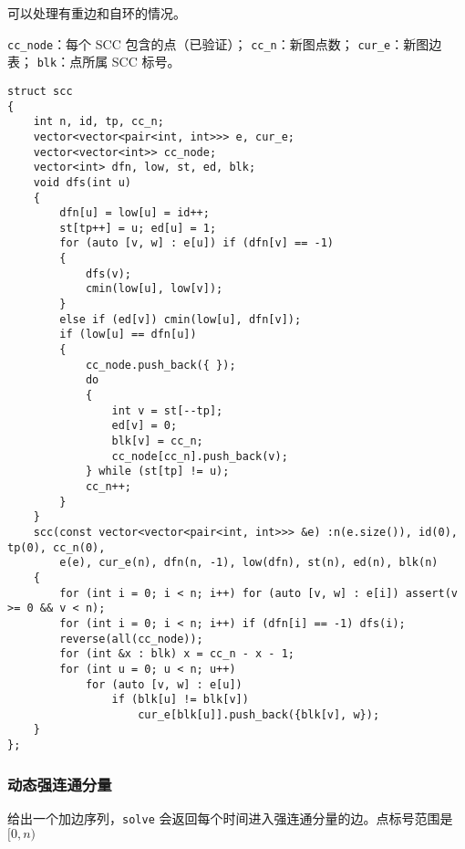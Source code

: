 \documentclass[12pt]{ctexart}
\begin{document}
可以处理有重边和自环的情况。

\verb|cc_node|：每个 SCC 包含的点（已验证）；
\verb|cc_n|：新图点数；
\verb|cur_e|：新图边表；
\verb|blk|：点所属 SCC 标号。

\begin{lstlisting}
struct scc
{
	int n, id, tp, cc_n;
	vector<vector<pair<int, int>>> e, cur_e;
	vector<vector<int>> cc_node;
	vector<int> dfn, low, st, ed, blk;
	void dfs(int u)
	{
		dfn[u] = low[u] = id++;
		st[tp++] = u; ed[u] = 1;
		for (auto [v, w] : e[u]) if (dfn[v] == -1)
		{
			dfs(v);
			cmin(low[u], low[v]);
		}
		else if (ed[v]) cmin(low[u], dfn[v]);
		if (low[u] == dfn[u])
		{
			cc_node.push_back({ });
			do
			{
				int v = st[--tp];
				ed[v] = 0;
				blk[v] = cc_n;
				cc_node[cc_n].push_back(v);
			} while (st[tp] != u);
			cc_n++;
		}
	}
	scc(const vector<vector<pair<int, int>>> &e) :n(e.size()), id(0), tp(0), cc_n(0),
		e(e), cur_e(n), dfn(n, -1), low(dfn), st(n), ed(n), blk(n)
	{
		for (int i = 0; i < n; i++) for (auto [v, w] : e[i]) assert(v >= 0 && v < n);
		for (int i = 0; i < n; i++) if (dfn[i] == -1) dfs(i);
		reverse(all(cc_node));
		for (int &x : blk) x = cc_n - x - 1;
		for (int u = 0; u < n; u++)
			for (auto [v, w] : e[u])
				if (blk[u] != blk[v])
					cur_e[blk[u]].push_back({blk[v], w});
	}
};
\end{lstlisting}

\subsubsection{动态强连通分量}

给出一个加边序列，\verb|solve| 会返回每个时间进入强连通分量的边。点标号范围是 $[0,n)$
\end{document}
